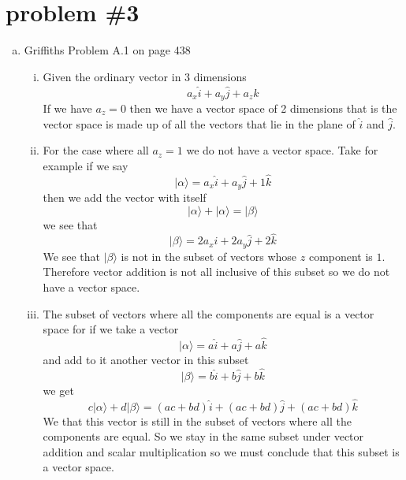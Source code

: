 \documentclass[11pt]{article}
\numberwithin{equation}{section}
\newcommand{\vect}[1]{|{#1}\rangle}
\begin{document}
\section{problem \#3}
\begin{enumerate}[(a)]
\item
Griffiths Problem A.1 on page 438 
\begin{enumerate}[(i)]
\item
Given the ordinary vector in 3 dimensions 
$$a_x\hat{i} + a_y\hat{j}+a_z\hat{k}$$
If we have $a_z = 0$ then we have a vector space of 2 dimensions that is the vector space is made up of all the vectors that lie in the plane of $\hat{i}$ and $\hat{j}$.

\item
For the case where all $a_z=1$ we do not have a vector space. Take for example if we say
$$\vect{\alpha} = a_x\hat{i} + a_y\hat{j}+1\hat{k}$$
then we add the vector with itself
$$\vect{\alpha} + \vect{\alpha} = \vect{\beta}$$
we see that 
$$\vect{\beta} = 2a_x\hat{i} + 2a_y\hat{j}+2\hat{k}$$
We see that $\vect{\beta}$ is not in the subset of vectors whose $z$ component is $1$. Therefore vector addition is not all inclusive of this subset so we do not have a vector space.

\item
The subset of vectors where all the components are equal is a vector space for if we take a vector
$$\vect{\alpha} = a\hat{i}+a\hat{j}+a\hat{k}$$
and add to it another vector in this subset
$$\vect{\beta} = b\hat{i}+b\hat{j}+b\hat{k}$$
we get
$$c\vect{\alpha}+d\vect{\beta} = (ac+bd)\hat{i}+(ac+bd)\hat{j}+(ac+bd)\hat{k}$$
We that this vector is still in the subset of vectors where all the components are equal. So we stay in the same subset under vector addition and scalar multiplication so we must conclude that this subset is a vector space.
\end{enumerate}


\end{enumerate}
\end{document}

